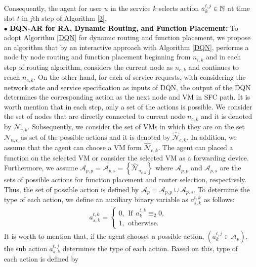 \documentclass[20pt,twocolumn]{IEEEtran}
\begin{document}
Consequently, the agent for user $u$ in the service $k$ selects action $a^{t,j}_{k}\in \Bbb{N}$ at time slot $t$ in $j$th step of Algorithm \ref{3}.\\
$\bullet$ \textcolor{black}{\textbf{DQN-AR  for RA, Dynamic Routing,  and Function Placement:}} To adopt Algorithm \ref{DQN} for dynamic routing and function placement, we propose an algorithm that  by  an interactive approach with Algorithm \ref{DQN}, performs a node by node routing and function placement  beginning from $n_{i,k}$ and in each step of routing algorithm, considers the current node as $n_{c,k}$ and continues to reach  $n_{e,k}$. On the other hand, for each of service requests, with considering the network state and service specification as inputs of DQN, the output of the DQN determines the corresponding action as the next node and VM in SFC path. 
It is worth mention that in each step, only a set of the actions is possible. %
 We consider the set of  nodes that are directly connected to current node $n_{c,k}$  and it is denoted by $\mathcal{N}_{c,k}$. 
	 Subsequently, we consider the set of VMs in which they are on the set $\mathcal{N}_{n,c}$ as set of the possible actions and it is denoted by $\hat{\mathcal{N}}_{c,k}$.
	In addition, we assume that the agent can choose a VM form $\hat{\mathcal{N}}_{c,k}$.
	The agent can placed a function on the selected VM or consider the  selected VM as a forwarding device. Furthermore, we assume $\mathcal{A}_{p,p}=\mathcal{A}_{p,s}=\left\lbrace  \hat{\mathcal{N}}_{n_{c,k}} \right\rbrace $ where $\mathcal{A}_{p,p}$ and $\mathcal{A}_{p,s}$ are the sets of possible actions for function placement and  router selection, respectively.
Thus, the set of possible action is defined by $\mathcal{A}_{p}=\mathcal{A}_{p,p}\cup\mathcal{A}_{p,s}$.
To determine the type of each action, we define an auxiliary binary variable as $a^{t,k}_{s,k}$ as follows:
\begin{align}
a^{t,k}_{s,k}=\begin{cases}
0,~~ \text{If} ~~ a^{t,k}_{k}\equiv_2 0,\\
1,~~ \text{otherwise}.
\end{cases}
\end{align}
It is worth to mention that, if the agent chooses a possible action, $(a^{t,j}_{k}\in{\mathcal{A}}_{p})$, the
sub action $a^{t,j}_{s,k}$ determines the type of each action. Based on this, type of each action is defined by 
\end{document}

